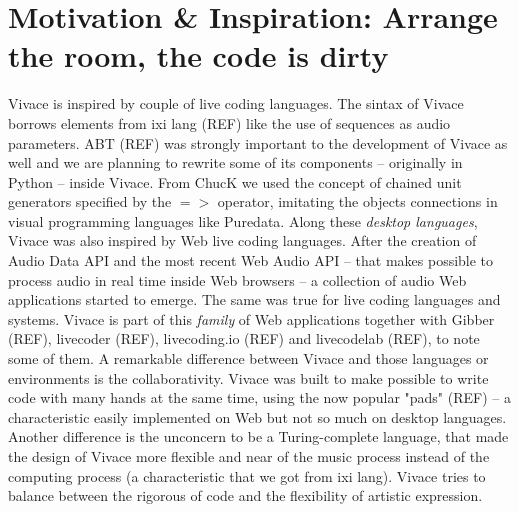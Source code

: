 \documentclass[letterpaper, 12pt]{article}
\begin{document}
\section{Motivation \& Inspiration: Arrange the room, the code is dirty}
Vivace is inspired by couple of live coding languages. The sintax of Vivace borrows elements from ixi lang (REF) like the use of sequences as audio parameters. ABT (REF) was strongly important to the development of Vivace as well and we are planning to rewrite some of its components -- originally in Python -- inside Vivace. From ChucK we used the concept of chained unit generators specified by the $=>$ operator, imitating the objects connections in visual programming languages like Puredata.
Along these \textit{desktop languages}, Vivace was also inspired by Web live coding languages. After the creation of Audio Data API and the most recent Web Audio API -- that makes possible to process audio in real time inside Web browsers -- a collection of audio Web applications started to emerge. The same was true for live coding languages and systems. Vivace is part of this \textit{family} of Web applications together with Gibber (REF), livecoder (REF), livecoding.io (REF) and livecodelab (REF), to note some of them. A remarkable difference between Vivace and those languages or environments is the collaborativity. Vivace was built to make possible to write code with many hands at the same time, using the now popular  "pads" (REF) -- a characteristic easily implemented on Web but not so much on desktop languages. Another difference is the unconcern to be a Turing-complete language, that made the design of Vivace more flexible and near of the music process instead of the computing process (a characteristic that we got from ixi lang). Vivace tries to balance between the rigorous of code and the flexibility of artistic expression.
\end{document}
